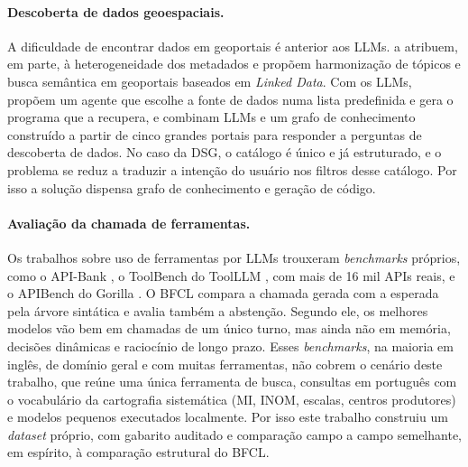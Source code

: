 \paragraph{Descoberta de dados geoespaciais.} A dificuldade de encontrar dados em geoportais é anterior aos LLMs.  a atribuem, em parte, à heterogeneidade dos metadados e propõem harmonização de tópicos e busca semântica em geoportais baseados em \textit{Linked Data}. Com os LLMs,  propõem um agente que escolhe a fonte de dados numa lista predefinida e gera o programa que a recupera, e  combinam LLMs e um grafo de conhecimento construído a partir de cinco grandes portais para responder a perguntas de descoberta de dados. No caso da DSG, o catálogo é único e já estruturado, e o problema se reduz a traduzir a intenção do usuário nos filtros desse catálogo. Por isso a solução dispensa grafo de conhecimento e geração de código.

\paragraph{Avaliação da chamada de ferramentas.} Os trabalhos sobre uso de ferramentas por LLMs trouxeram \textit{benchmarks} próprios, como o API-Bank \cite{li2023apibank}, o ToolBench do ToolLLM \cite{qin2023toolllm}, com mais de 16 mil APIs reais, e o APIBench do Gorilla \cite{patil2023gorilla}. O BFCL \cite{patil2025berkeley} compara a chamada gerada com a esperada pela árvore sintática e avalia também a abstenção. Segundo ele, os melhores modelos vão bem em chamadas de um único turno, mas ainda não em memória, decisões dinâmicas e raciocínio de longo prazo. Esses \textit{benchmarks}, na maioria em inglês, de domínio geral e com muitas ferramentas, não cobrem o cenário deste trabalho, que reúne uma única ferramenta de busca, consultas em português com o vocabulário da cartografia sistemática (MI, INOM, escalas, centros produtores) e modelos pequenos executados localmente. Por isso este trabalho construiu um \textit{dataset} próprio, com gabarito auditado e comparação campo a campo semelhante, em espírito, à comparação estrutural do BFCL.

